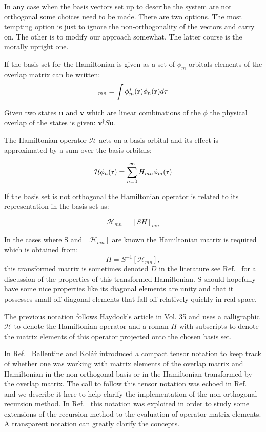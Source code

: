 In any case when the basis vectors set up to describe the system
are not orthogonal some choices need to be made. There are two options.
The most tempting option is just to ignore the non-orthogonality of the
vectors and carry on. The other is to modify our approach somewhat. 
The latter course is the morally upright one. 

If the basis set for the Hamiltonian is given as a set of
${\phi_{m}}$ orbitals elements of the overlap matrix can 
be written:
%
\begin{equation}
[S]_{mn} = \int \phi^{*}_{m}(\r)\phi_{n}(\r)d\tau
\end{equation}
%

Given two states $\mathbf{u}$ and $\mathbf{v}$ which
are linear combinations of the $\phi$ the physical
overlap of the states is given: $\mathbf{v}^{\dagger}S\mathbf{u}$.

The Hamiltonian operator $\mathcal{H}$ acts on a basis orbital and
its effect is approximated by a sum over the basis orbitals:

\begin{equation}
\mathcal{H}\phi_{n}(\mathbf{r}) = \sum_{n=0}^{\infty} H_{mn}\phi_{m}({\bf r})
\end{equation}

If the basis set is not orthogonal the Hamiltonian operator
is related to its representation in the basis set as:

\begin{equation}
\mathcal{H}_{mn} = [SH]_{mn}
\end{equation}

In the cases where S and $[\mathcal{H}_{mn}]$ are known the Hamiltonian
matrix is required which is obtained from:
%
\begin{equation}
H = S^{-1}[\mathcal{H}_{mn}],
\end{equation}
%
this transformed matrix is sometimes denoted $D$ in the literature
see Ref.~\cite{weeks73} for a discussion of the properties of
this transformed Hamiltonian. S should hopefully have some 
nice properties like its diagonal elements are unity and that it 
possesses small off-diagonal elements that fall off relatively 
quickly in real space.

The previous notation follows Haydock's article in Vol. 35 and uses 
a calligraphic $\mathcal{H}$ to denote the Hamiltonian operator and 
a roman $H$ with subscripts to denote the matrix elements of this operator 
projected onto the chosen basis set. 

In Ref.~\cite{ballentine86} Ballentine and Kol\'a\'r introduced 
a compact tensor notation to keep track of whether one was working 
with matrix elements of the overlap matrix and Hamiltonian 
in the non-orthogonal basis or in the Hamiltonian transformed by
the overlap matrix. The call to follow this tensor notation 
was echoed in Ref.~\cite{sutton88} and we describe it here to help
clarify the implementation of the non-orthogonal recursion method.
In Ref.~\cite{foulkes86} this notation was exploited in order to 
study some extensions of the recursion method to the evaluation of 
operator matrix elements. A transparent notation can greatly clarify
the concepts.

